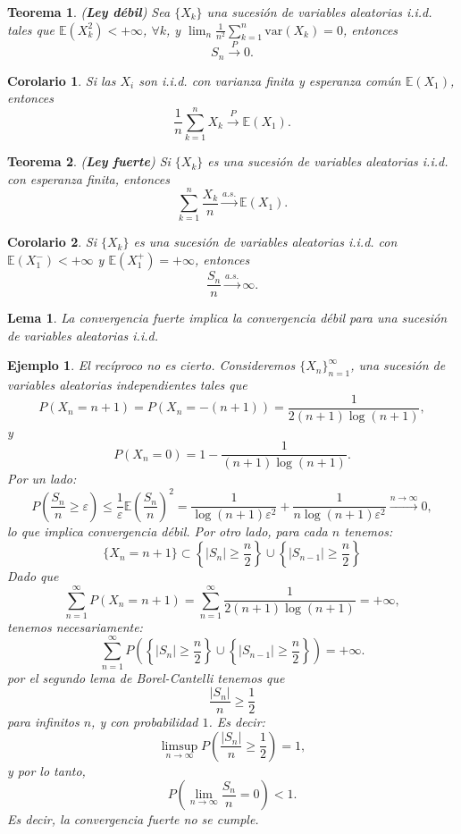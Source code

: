 \documentclass{report}
\newtheorem{thm}{Teorema}[section]
\newtheorem{lem}{Lema}[section]
\newtheorem{cor}{Corolario}[thm]
\newtheorem{ej}{Ejemplo}[section]
\begin{document}
\begin{thm} \label{thm:ley_debil} (\textbf{Ley débil}) Sea $\{X_k\}$ una sucesión de variables aleatorias i.i.d.
    tales que $\mathbb{E}(X_k^2) < +\infty$, $\forall k$, y $\lim_n \frac{1}{n^2} \sum_{k=1}^n \mathrm{var}(X_k) = 0$, entonces
\[
S_n \xrightarrow{P} 0.
\]
\end{thm}

\begin{cor}
Si las \( X_i \) son \emph{i.i.d.} con varianza finita y esperanza común \( \mathbb{E}(X_1) \), entonces
\[
\frac{1}{n} \sum_{k=1}^n X_k \xrightarrow{P} \mathbb{E}(X_1).
\]
\end{cor}


\begin{thm} \label{thm:ley_fuerte} (\textbf{Ley fuerte}) Si $\{X_k\}$ es una sucesión de variables aleatorias i.i.d. con esperanza finita, entonces
\[
\sum_{k=1}^n \frac{X_k}{n} \xrightarrow{a.s.} \mathbb{E}(X_1).
\]
\end{thm}


\begin{cor} \label{cor:divergence_positive_infinite_mean}
Si $\{X_k\}$ es una sucesión de variables aleatorias i.i.d. con $\mathbb{E}(X_1^-) < +\infty$ y $\mathbb{E}(X_1^+) = +\infty$,
entonces $$\frac{S_n}{n} \xrightarrow{a.s.} \infty.$$
\end{cor}

\begin{lem}
    La convergencia fuerte implica la convergencia débil para una sucesión de variables aleatorias i.i.d.    
\end{lem}

\begin{ej}
El recíproco no es cierto. Consideremos \( \{X_n\}_{n=1}^\infty \), una sucesión de variables aleatorias independientes tales que
\[
P(X_n = n+1) = P(X_n = -(n+1)) = \frac{1}{2(n+1)\log(n+1)},
\]
y
\[
P(X_n = 0) = 1 - \frac{1}{(n+1)\log(n+1)}.
\] 
Por un lado:
$$
P\left(\frac{S_n}{n}\geq \varepsilon\right) \leq \frac{1}{\varepsilon}\mathbb{E}\left(\frac{S_n}{n}\right)^2 = 
\frac{1}{\log(n+1)\varepsilon^2}+\frac{1}{n\log(n+1)\varepsilon^2} \xrightarrow{n\rightarrow\infty} 0,
$$
lo que implica convergencia débil. Por otro lado, para cada $n$ tenemos:
$$
\{X_n = n+1\} \subset \left\{ |S_n|\geq \frac{n}{2} \right\} \cup \left\{ |S_{n-1}|\geq \frac{n}{2} \right\} 
$$
Dado que
\[
\sum_{n=1}^{\infty} P(X_n = n+1) = \sum_{n=1}^{\infty} \frac{1}{2(n+1)\log(n+1)} = +\infty,
\]
tenemos necesariamente:
\[
\sum_{n=1}^{\infty} P\left(\left\{ |S_n|\geq \frac{n}{2} \right\} \cup \left\{ |S_{n-1}|\geq \frac{n}{2} \right\} \right)  = +\infty.
\]
por el segundo lema de Borel-Cantelli tenemos que 
\[
\frac{|S_n|}{n}\geq \frac{1}{2}
\]
para infinitos $n$, y con probabilidad $1$. Es decir:
\[
\limsup_{n \to \infty} P \left( \frac{|S_n|}{n} \geq \frac{1}{2} \right) = 1,
\]
y por lo tanto,
\[
P \left( \lim_{n \to \infty} \frac{S_n}{n} = 0 \right) < 1.
\]
Es decir, la convergencia fuerte no se cumple.
\end{ej}
\end{document}
